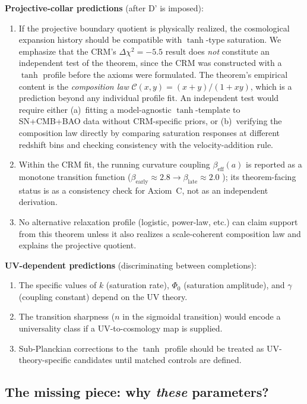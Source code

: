 \documentclass[aps,prd,twocolumn,superscriptaddress,nofootinbib]{revtex4-2}
\begin{document}
\textbf{Projective-collar predictions} (after D' is imposed):
\begin{enumerate}
\item If the projective boundary quotient is physically realized, the cosmological expansion history should be compatible with $\tanh$-type saturation. We emphasize that the CRM's $\Delta\chi^2 = -5.5$ result \cite{Geiger2026b} does \textit{not} constitute an independent test of the theorem, since the CRM was constructed with a $\tanh$ profile before the axioms were formulated. The theorem's empirical content is the \textit{composition law} $\mathcal{C}(x,y) = (x+y)/(1+xy)$, which is a prediction beyond any individual profile fit. An independent test would require either (a)~fitting a model-agnostic $\tanh$-template to SN+CMB+BAO data without CRM-specific priors, or (b)~verifying the composition law directly by comparing saturation responses at different redshift bins and checking consistency with the velocity-addition rule.
\item Within the CRM fit, the running curvature coupling $\beta_{\mathrm{eff}}(a)$ is reported as a monotone transition function ($\beta_{\mathrm{early}} \approx 2.8 \to \beta_{\mathrm{late}} \approx 2.0$ \cite{Geiger2026b}); its theorem-facing status is as a consistency check for Axiom~C, not as an independent derivation.
\item No alternative relaxation profile (logistic, power-law, etc.) can claim support from this theorem unless it also realizes a scale-coherent composition law and explains the projective quotient.
\end{enumerate}

\textbf{UV-dependent predictions} (discriminating between completions):
\begin{enumerate}
\item The specific values of $k$ (saturation rate), $\Phi_0$ (saturation amplitude), and $\gamma$ (coupling constant) depend on the UV theory.
\item The transition sharpness ($n$ in the sigmoidal transition) would encode a universality class if a UV-to-cosmology map is supplied.
\item Sub-Planckian corrections to the $\tanh$ profile should be treated as UV-theory-specific candidates until matched controls are defined.
\end{enumerate}

\subsection{The missing piece: why \textit{these} parameters?}
\end{document}
